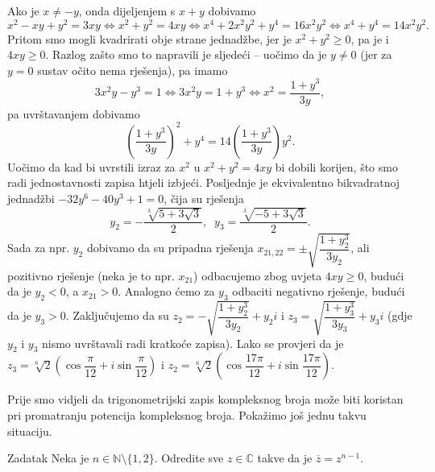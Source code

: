 \begin{proof*}
Ako je $x\neq -y$, onda dijeljenjem s $x+y$ dobivamo
$$x^2-xy+y^2=3xy\Leftrightarrow x^2+y^2=4xy\Leftrightarrow x^4+2x^2y^2+y^4=16x^2y^2\Leftrightarrow x^4+y^4=14x^2y^2.$$
Pritom smo mogli kvadrirati obje strane jednadžbe, jer je $x^2+y^2\geq 0$, pa je i $4xy\geq 0$. Razlog zašto smo to napravili je sljedeći -- uočimo da je $y\neq 0$ (jer za $y=0$ sustav očito nema rješenja), pa imamo
$$3x^2y-y^3=1\Leftrightarrow 3x^2y=1+y^3\Leftrightarrow x^2=\dfrac{1+y^3}{3y},$$
pa uvrštavanjem dobivamo
$$\left(\dfrac{1+y^3}{3y}\right)^2+y^4=14\left(\dfrac{1+y^3}{3y}\right)y^2.$$
Uočimo da kad bi uvrstili izraz za $x^2$ u $x^2+y^2=4xy$ bi dobili korijen, što smo radi jednostavnosti zapisa htjeli izbjeći. Posljednje je ekvivalentno bikvadratnoj jednadžbi $-32y^6-40y^3+1=0$, čija su rješenja
$$y_2=-\dfrac{\sqrt[3]{5+3\sqrt{3}}}{2},\;\; y_3=\dfrac{\sqrt[3]{-5+3\sqrt{3}}}{2}.$$
Sada za npr. $y_2$ dobivamo da su pripadna rješenja $x_{21, 22}=\pm \sqrt{\dfrac{1+y_2^3}{3y_2}}$, ali pozitivno rješenje (neka je to npr. $x_{21}$) odbacujemo zbog uvjeta $4xy\geq 0$, budući da je $y_2<0$, a $x_{21}>0$. Analogno ćemo za $y_3$ odbaciti negativno rješenje, budući da je $y_3>0$. Zaključujemo da su $z_2=-\sqrt{\dfrac{1+y_2^3}{3y_2}}+y_2i$ i $z_3=\sqrt{\dfrac{1+y_3^3}{3y_3}}+y_3i$ (gdje $y_2$ i $y_3$ nismo uvrštavali radi kratkoće zapisa). Lako se provjeri da je $z_3=\sqrt[6]{2}\left(\cos{\dfrac{\pi}{12}}+i\sin{\dfrac{\pi}{12}}\right)$ i $z_2=\sqrt[6]{2}\left(\cos{\dfrac{17\pi}{12}}+i\sin{\dfrac{17\pi}{12}}\right)$.
\end{proof*}
Prije smo vidjeli da trigonometrijski zapis kompleksnog broja može biti koristan pri promatranju potencija kompleksnog broja. Pokažimo još jednu takvu situaciju.
\begin{exercise}{Zadatak}
\label{trigcmplx}
Neka je $n\in \mathbb{N}\setminus\{1, 2\}$. Odredite sve $z\in \mathbb{C}$ takve da je $\overline{z}=z^{n-1}$.
\end{exercise}
